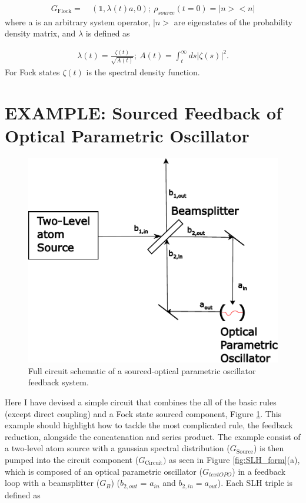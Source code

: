 \documentclass[a4paper]{article}
\theoremstyle{definition}
\begin{document}
\begin{align}
    G_{\text{Flock}} = & \ (\mathbb{1}, \lambda(t)a,0); \ \rho_{source}(t=0)= |n><n|
    \label{eq:sourced_term}
\end{align}
where a is an arbitrary system operator, $|n>$ are eigenstates of the probability density matrix, and $\lambda$ is defined as 

\begin{align*}
    \lambda(t) = \frac{\zeta(t)}{\sqrt{A(t)}} ; \ A(t) = \int_{t}^{\infty} ds |\zeta(s)|^2.
\end{align*}
For Fock states $\zeta(t)$ is the spectral density function.  
\section{EXAMPLE: Sourced Feedback of Optical Parametric Oscillator}


\begin{figure}[H]
\centering
\includegraphics[width = 7.5 cm]{Example_Sourced_feedback.pdf}
\caption{Full circuit schematic of a sourced-optical parametric oscillator feedback system.
}
\label{fig:Example}
\end{figure}  

Here I have devised a simple circuit that combines the all of the basic rules (except direct coupling) and a Fock state sourced component, Figure \ref{fig:Example}. This example should highlight how to tackle the most complicated rule, the feedback reduction, alongside the concatenation and series product. The example consist of a two-level atom source with a gaussian spectral distribution ($G_{\text{Source}} $) is then pumped into the circuit component ($G_{\text{Circuit}})$ as seen in Figure \ref{fig:SLH_form}(a), which is composed of an optical parametric oscillator ($G_{text{OPO}}$) in a feedback loop with a beamsplitter ($G_B$) ($b_{2,out}$ = $a_{in}$ and $b_{2,in} = a_{out}$). Each SLH triple is defined as 
\end{document}

